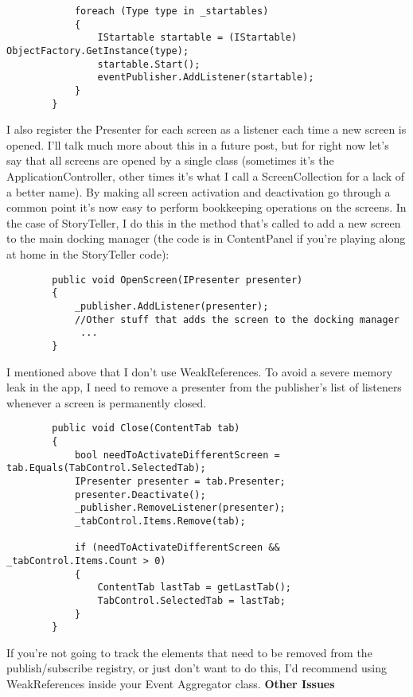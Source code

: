 \documentclass{article}
\begin{document}
{\begin{lstlisting}
            foreach (Type type in _startables)
            {
                IStartable startable = (IStartable) ObjectFactory.GetInstance(type);
                startable.Start();
                eventPublisher.AddListener(startable);
            }
        }
\end{lstlisting}

I also register the Presenter for each screen as a listener each time a new screen is opened.  I'll talk much more about this in a future post, but for right now let's say that all screens are opened by a single class (sometimes it's the ApplicationController, other times it's what I call a ScreenCollection for a lack of a better name).  By making all screen activation and deactivation go through a common point it's now easy to perform bookkeeping operations on the screens.  In the case of StoryTeller, I do this in the method that's called to add a new screen to the main docking manager (the code is in ContentPanel if you're playing along at home in the StoryTeller code):
 
\begin{lstlisting}
        public void OpenScreen(IPresenter presenter)
        {
            _publisher.AddListener(presenter);
            //Other stuff that adds the screen to the docking manager
			 ...
        }
\end{lstlisting}		

I mentioned above that I don't use WeakReferences.  To avoid a severe memory leak in the app, I need to remove a presenter from the publisher's list of listeners whenever a screen is permanently closed.

 \begin{lstlisting}
        public void Close(ContentTab tab)
        {
            bool needToActivateDifferentScreen = tab.Equals(TabControl.SelectedTab);
            IPresenter presenter = tab.Presenter;
            presenter.Deactivate();
            _publisher.RemoveListener(presenter);
            _tabControl.Items.Remove(tab);

            if (needToActivateDifferentScreen && _tabControl.Items.Count > 0)
            {
                ContentTab lastTab = getLastTab();
                TabControl.SelectedTab = lastTab;
            }
        }
\end{lstlisting}

If you're not going to track the elements that need to be removed from the publish/subscribe registry, or just don't want to do this, I'd recommend using WeakReferences inside your Event Aggregator class.
\Large {\textbf{Other Issues}}

}
\end{document}
